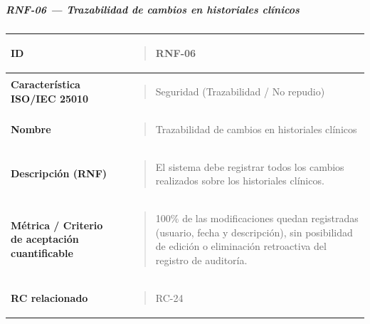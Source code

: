 \documentclass[
]{article}
\newcounter{none} %
\begin{document}
\subparagraph{RNF-06 --- Trazabilidad de cambios en historiales
clínicos}\label{rnf-06-trazabilidad-de-cambios-en-historiales-clinicos}

{\def\LTcaptype{none} %
\begin{longtable}[]{@{}
  >{\raggedright\arraybackslash}p{}
  >{\raggedright\arraybackslash}p{}@{}}
\toprule\noalign{}
\begin{minipage}[b]{\linewidth}\raggedright
\textbf{ID}
\end{minipage} & \begin{minipage}[b]{\linewidth}\raggedright
\begin{quote}
RNF-06
\end{quote}
\end{minipage} \\
\midrule\noalign{}
\endhead
\bottomrule\noalign{}
\endlastfoot
\textbf{Característica ISO/IEC 25010} & \begin{minipage}[t]{\linewidth}\raggedright
\begin{quote}
Seguridad (Trazabilidad / No repudio)
\end{quote}
\end{minipage} \\
\textbf{Nombre} & \begin{minipage}[t]{\linewidth}\raggedright
\begin{quote}
Trazabilidad de cambios en historiales clínicos
\end{quote}
\end{minipage} \\
\textbf{Descripción (RNF)} & \begin{minipage}[t]{\linewidth}\raggedright
\begin{quote}
El sistema debe registrar todos los cambios realizados sobre los
historiales clínicos.
\end{quote}
\end{minipage} \\
\textbf{Métrica / Criterio de aceptación cuantificable} & \begin{minipage}[t]{\linewidth}\raggedright
\begin{quote}
100\% de las modificaciones quedan registradas (usuario, fecha y
descripción), sin posibilidad de edición o eliminación retroactiva del
registro de auditoría.
\end{quote}
\end{minipage} \\
\textbf{RC relacionado} & \begin{minipage}[t]{\linewidth}\raggedright
\begin{quote}
RC-24
\end{quote}
\end{minipage} \\
\end{longtable}
}
\end{document}
